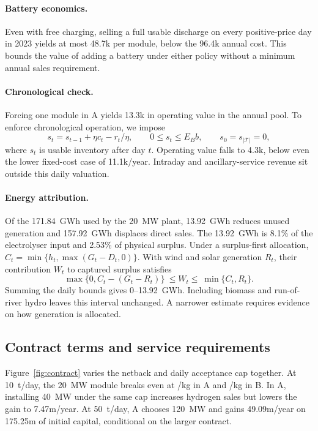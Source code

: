 \paragraph{Battery economics.}
Even with free charging, selling a full usable discharge on every
positive-price day in 2023 yields at most \gbp 48.7k per module, below the
\gbp 96.4k annual cost. This bounds the value of adding a battery under
either policy without a minimum annual sales requirement.

\paragraph{Chronological check.}
Forcing one module in A yields \gbp 13.3k in operating value in the annual
pool. To enforce chronological operation, we impose
\begin{equation}
  s_t=s_{t-1}+\eta c_t-r_t/\eta,\qquad
  0\le s_t\le E_B b,\qquad s_0=s_{|\mathcal T|}=0,
  \label{eq:stock}
\end{equation}
where \(s_t\) is usable inventory after day \(t\). Operating value
falls to \gbp 4.3k, below even the lower fixed-cost case of
\gbp 11.1k/year. Intraday and ancillary-service revenue sit outside this
daily valuation.

\paragraph{Energy attribution.}
Of the 171.84~GWh used by the 20~MW plant, 13.92~GWh reduces unused
generation and 157.92~GWh displaces direct sales. The 13.92~GWh is 8.1\%
of the electrolyser input and 2.53\% of physical surplus.
Under a surplus-first allocation, \(C_t=\min\{h_t,\max(G_t-D_t,0)\}\).
With wind and solar generation \(R_t\), their contribution \(W_t\) to
captured surplus satisfies
\begin{equation}
  \max\{0,C_t-(G_t-R_t)\}\ \le W_t\le\ \min\{C_t,R_t\}.
  \label{eq:attribution}
\end{equation}
Summing the daily bounds gives 0--13.92~GWh. Including biomass and
run-of-river hydro leaves this interval unchanged. A narrower estimate
requires evidence on how generation is allocated.

\subsection{Contract terms and service requirements}\label{sec:contracts}
Figure~\ref{fig:contract} varies the netback and daily acceptance cap
together. At 10~t/day, the 20~MW module breaks even at /kg in A
and /kg in B. In A, installing 40~MW under the same cap increases
hydrogen sales but lowers the gain to \gbp 7.47m/year. At 50~t/day, A
chooses 120~MW and gains \gbp 49.09m/year on \gbp 175.25m of initial
capital, conditional on the larger contract.

